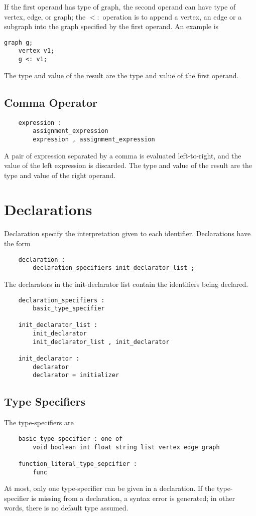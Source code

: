 \documentclass[letterpaper,12pt]{article}
\begin{document}
If the first operand has type of graph, the second operand can have type of vertex, edge, or graph; the $<:$ operation is to append a vertex, an edge or a subgraph into the graph specified by the first operand. An example is
\begin{lstlisting}[frame=none]
	graph g;
	vertex v1;
	g <: v1;
\end{lstlisting}

The type and value of the result are the type and value of the first operand.

\subsection{Comma Operator}
\begin{lstlisting}
	expression :
		assignment_expression
		expression , assignment_expression
\end{lstlisting}
A pair of expression separated by a comma is evaluated left-to-right, and the value of the left expression is discarded. The type and value of the result are the type and value of the right operand.

\section{Declarations}
Declaration specify the interpretation given to each identifier. Declarations have the form
\begin{lstlisting}
	declaration :
		declaration_specifiers init_declarator_list ;
\end{lstlisting}
The declarators in the init-declarator list contain the identifiers being declared.
\begin{lstlisting}
	declaration_specifiers :
		basic_type_specifier
	
	init_declarator_list :
		init_declarator
		init_declarator_list , init_declarator

	init_declarator :
		declarator
		declarator = initializer
\end{lstlisting}

\subsection{Type Specifiers}\label{sec:type_spcifiers}
The type-specifiers are
\begin{lstlisting}
	basic_type_specifier : one of
		void boolean int float string list vertex edge graph

	function_literal_type_sepcifier :
		func
\end{lstlisting}
At most, only one type-specifier can be given in a declaration. If the type-specifier is missing from a declaration, a syntax error is generated; in other words, there is no default type assumed.
\end{document}
